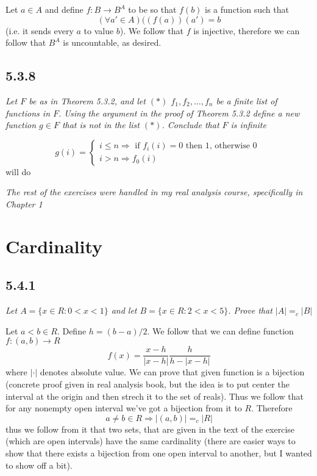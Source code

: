 \documentclass[11pt,oneside,titlepage]{book}
\DeclareMathOperator \ra {\Rightarrow}
\begin{document}
Let $a \in A$ and define $f: B \to B^A$ to be so that $f(b)$ is a function such that
$$(\forall a'\in A)((f(a))(a') = b$$
(i.e. it sends every $a$ to value $b$). We follow that $f$ is injective, therefore
we can follow that $B^A$ is uncountable, as desired.

\subsection*{5.3.8}

\textit{Let $F$ be as in Theorem 5.3.2, and let $(*)$ $f_1, f_2, ..., f_n$ be a finite
  list of functions in $F$. Using the argument in the proof of Theorem 5.3.2
  define a new function $g \in F$ that is not in the list $(*)$. Conclude that $F$ is infinite}

$$
g(i) =
\begin{cases}
  i \leq n \ra \text{ if $f_i(i) = 0$ then 1, otherwise 0 } \\
  i > n \ra f_0(i)
\end{cases}
$$
will do


\textit{The rest of the exercises were handled in my real analysis course, specifically in
  Chapter 1}

\section{Cardinality}

\subsection*{5.4.1}

\textit{Let $A = \{x \in R: 0 < x < 1\}$ and let $B = \{x \in R: 2 < x < 5\}$. Prove that
  $|A| =_c |B|$}

Let $a < b \in R$. Define $h = (b - a)/2$. We follow that we can define function $f: (a, b) \to R$
$$f(x) = \frac{x - h}{|x - h|} \frac{h}{h - |x - h|}$$
where $|\cdot|$ denotes absolute value. We can prove that given function
is a bijection (concrete proof given in real analysis book, but the
idea is to put center the interval at the origin and then strech it to the set of reals).
Thus we follow that for any nonempty open interval we've got a bijection from it to $R$. Therefore
$$a \neq b \in R \ra |(a, b)| =_c |R|$$
thus we follow from it that two sets, that are given in the
text of the exercise (which are open intervals) have the same
cardinality (there are easier ways to show that there exists a bijection from one
open interval to another, but I wanted to show off a bit).
\end{document}

